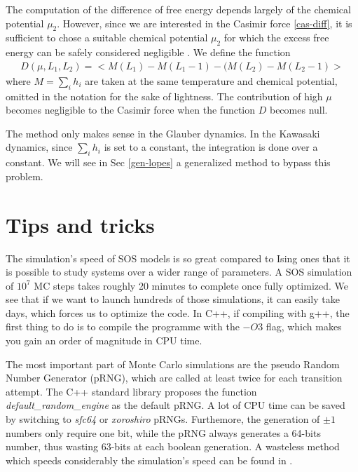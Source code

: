 The computation of the difference of free energy depends largely of the chemical potential $\mu_2$. However, since we are interested in the Casimir force \eqref{cas-diff}, it is sufficient to chose a suitable chemical potential $\mu_2$ for which the excess free energy can be safely considered negligible \cite{lopes_cardozo_critical_2014} . We define the function
\begin{align}
    D(\mu,L_1,L_2) =  < M(L_1)-M(L_1-1) - (M(L_2)-M(L_2-1) >
    \label{function-d}
\end{align}
where $M=\sum_i h_i$ 
are taken at the same temperature and chemical potential, 
omitted in the notation for the sake of lightness. The contribution of high $\mu$ becomes negligible to the Casimir force when the function $D$ becomes null.


The method only makes sense in the Glauber dynamics. In the Kawasaki dynamics, since $\sum_i h_i$ is set to a constant, the integration is done over a constant. We will see in Sec \ref{gen-lopes} a generalized method to bypass this problem.

\section{Tips and tricks}

The simulation's speed of SOS models is so great compared to Ising ones that it is possible to study systems over a wider range of parameters. A SOS simulation of $10^7$ MC steps takes roughly 20 minutes to complete once fully optimized. We see that if we want to launch hundreds of those simulations, it can easily take days, which forces us to optimize the code.
In C++, if compiling with g++, the first thing to do is to compile the programme with the $-O3$ flag, which makes you gain an order of magnitude in CPU time.

The most important part of Monte Carlo simulations are the pseudo Random Number Generator (pRNG), which are called at least twice for each transition attempt. The C++ standard library proposes the function \textit{default\_random\_engine} as the default pRNG. A lot of CPU time can be saved by switching to \textit{sfc64} or \textit{xoroshiro} pRNGs. Furthemore, the generation of $\pm1$ numbers only require one bit, while the pRNG always generates a 64-bits number, thus wasting 63-bits at each boolean generation. A wasteless method which speeds considerably the simulation's speed can be found in \cite{martin_ankerl_fast_nodate}.


